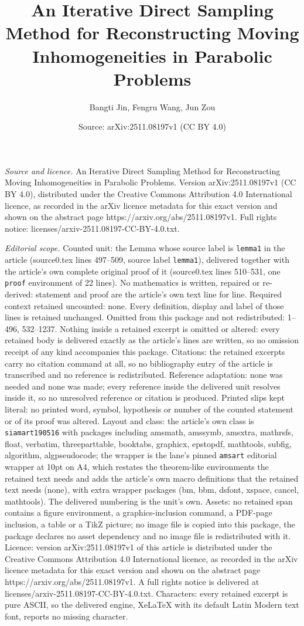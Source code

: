 \documentclass[10pt,a4paper]{amsart}
\title[An Iterative Direct Sampling Method for Reconstructing Movin]{An Iterative Direct Sampling Method for Reconstructing Moving Inhomogeneities in Parabolic Problems}
\author{Bangti Jin, Fengru Wang, Jun Zou}
\date{Source: arXiv:2511.08197v1 (CC BY 4.0)}
\begin{document}
\maketitle

\noindent\emph{Source and licence.} An Iterative Direct Sampling Method for Reconstructing Moving Inhomogeneities in Parabolic Problems. Version arXiv:2511.08197v1 (CC BY 4.0), distributed under the Creative Commons Attribution 4.0 International licence, as recorded in the arXiv licence metadata for this exact version and shown on the abstract page https://arxiv.org/abs/2511.08197v1. Full rights notice: licenses/arxiv-2511.08197-CC-BY-4.0.txt.\par\smallskip

\noindent\textit{Editorial scope.} Counted unit: the Lemma whose source label is \texttt{lemma1} in the article (source0.tex lines 497--509, source label \texttt{lemma1}), delivered together with the article's own complete original proof of it (source0.tex lines 510--531, one \texttt{proof} environment of 22 lines). No mathematics is written, repaired or re-derived: statement and proof are the article's own text line for line. Required context retained uncounted: none. Every definition, display and label of those lines is retained unchanged. Omitted from this package and not redistributed: 1--496, 532--1237. Nothing inside a retained excerpt is omitted or altered: every retained body is delivered exactly as the article's lines are written, so no omission receipt of any kind accompanies this package. Citations: the retained excerpts carry no citation command at all, so no bibliography entry of the article is transcribed and no reference is redistributed. Reference adaptation: none was needed and none was made; every reference inside the delivered unit resolves inside it, so no unresolved reference or citation is produced. Printed slips kept literal: no printed word, symbol, hypothesis or number of the counted statement or of its proof was altered. Layout and class: the article's own class is \texttt{siamart190516} with packages including amsmath, amssymb, amsxtra, mathrsfs, float, verbatim, threeparttable, booktabs, graphicx, epstopdf, mathtools, subfig, algorithm, algpseudocode; the wrapper is the lane's pinned \texttt{amsart} editorial wrapper at 10pt on A4, which restates the theorem-like environments the retained text needs and adds the article's own macro definitions that the retained text needs (none), with extra wrapper packages (bm, bbm, dsfont, xspace, cancel, mathtools). The delivered numbering is the unit's own. Assets: no retained span contains a figure environment, a graphics-inclusion command, a PDF-page inclusion, a table or a TikZ picture; no image file is copied into this package, the package declares no asset dependency and no image file is redistributed with it. Licence: version arXiv:2511.08197v1 of this article is distributed under the Creative Commons Attribution 4.0 International licence, as recorded in the arXiv licence metadata for this exact version and shown on the abstract page https://arxiv.org/abs/2511.08197v1. A full rights notice is delivered at licenses/arxiv-2511.08197-CC-BY-4.0.txt. Characters: every retained excerpt is pure ASCII, so the delivered engine, XeLaTeX with its default Latin Modern text font, reports no missing character.
\end{document}
